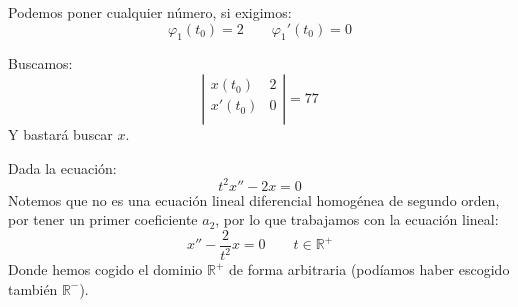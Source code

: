 \begin{ejemplo}
    Podemos poner cualquier número, si exigimos:
    \begin{equation*}
        \varphi_1(t_0) = 2 \qquad \varphi_1'(t_0) = 0
    \end{equation*}

    Buscamos:
    \begin{equation*}
        \left|\begin{array}{cc}
            x(t_0) & 2 \\
            x'(t_0) & 0 \\
        \end{array}\right| = 77
    \end{equation*}
    Y bastará buscar $x$.
\end{ejemplo}

\begin{ejemplo}
    Dada la ecuación:
    \begin{equation*}
        t^2 x'' - 2x = 0
    \end{equation*}
    Notemos que no es una ecuación lineal diferencial homogénea de segundo orden, por tener un primer coeficiente $a_2$, por lo que trabajamos con la ecuación lineal:
    \begin{equation*}
        x'' - \dfrac{2}{t^2}x = 0 \qquad t\in \mathbb{R}^+
    \end{equation*}
    Donde hemos cogido el dominio $\mathbb{R}^+$ de forma arbitraria (podíamos haber escogido también $\mathbb{R}^-$).\\


\end{ejemplo}
